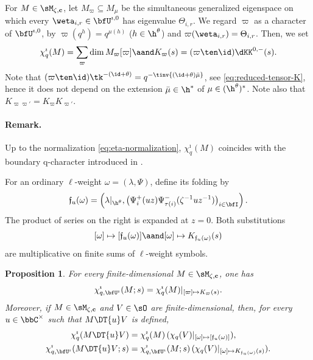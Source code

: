 \documentclass[reqno]{amsart}
\numberwithin{equation}{section}
\newtheorem*{proposition}{Proposition}
\newenvironment{remark}{\medskip\paragraph{{\bf Remark.}}}{\par\medskip}
\begin{document}
For $M\in\sM_{\zeta,\mathbf c}$, let
$M_\varpi\subseteq M_\mu$ be the simultaneous generalized
eigenspace on which every $\weta_{i,r}\in\bfU^{\imath,0}$ has eigenvalue
$\Theta_{i,r}$. We regard $\varpi$ as a character of $\bfU^{\imath,0}$, by
$\varpi(q^{h})=q^{\mu(h)}$ ($h\in\h^\theta$) and $\varpi(\weta_{i,r})=\Theta_{i,r}$.
Then, we set
\begin{equation}\label{eq:boundary-ell-character}
\chi^\imath_q(M)=\sum_\varpi\dim M_\varpi[\varpi]
\aand K_\varpi(s)=(\varpi\ten\id)\dKK^{0,-}(s).
\end{equation}
Note that $(\varpi\ten\id)\tk^{-(\id+\theta)}=q^{-\tinv{(\id+\theta)\bar\mu}}$, see \eqref{eq:reduced-tensor-K}, hence it does not depend on the extension $\bar\mu\in\h^*$ of $\mu\in(\h^\theta)^*$.
Note also that $K_{\varpi\varpi'}=K_\varpi K_{\varpi'}$.

\begin{remark}
Up to the normalization \eqref{eq:eta-normalization}, $\chi^\imath_q(M)$
coincides with the boundary q-character introduced in \cite{li-przezdziecki-25, li-przezdziecki-26}.\hfill\rmkend 
\end{remark}

For an ordinary $\ell$-weight $\omega=(\lambda,\Psi)$, define its folding
by
\begin{equation}\label{eq:boundary-ell-weight-folding}
\mathfrak f_u(\omega)=
\left(\lambda|_{\h^\theta},
\bigl(\Psi_i^+(uz)
\Psi_{\tau(i)}^-(\zeta^{-1}uz^{-1})\bigr)_{i\in\bfI}\right).
\end{equation}
The product of series on the right is expanded at $z=0$.
Both substitutions
\begin{equation}\label{eq:boundary-folding-map}
[\omega]\mapsto[\mathfrak f_u(\omega)]
\aand
[\omega]\mapsto K_{\mathfrak f_u(\omega)}(s)
\end{equation}
are multiplicative on finite sums of $\ell$-weight symbols.

\begin{proposition}\label{prop:boundary-left-module-property}
For every finite-dimensional $M\in\sM_{\zeta,\mathbf c}$, one has
\begin{equation}\label{eq:left-boundary-character-weights}
\chi^\imath_{q,\bfU^\imath}(M;s)
=\chi^\imath_q(M)\vert_{[\varpi]\mapsto K_\varpi(s)}.
\end{equation}
Moreover, if $M\in\sM_{\zeta,\mathbf c}$ and $V\in\sO$ are finite-dimensional,
then, for every $u\in\bbC^\times$ such that $M\DT{u}V$ is defined,
\begin{align}
\chi^\imath_q(M\DT{u}V)
&=\chi^\imath_q(M)\, (\chi_q(V)\vert_{[\omega]\mapsto[\mathfrak f_u(\omega)]}),
\label{eq:boundary-character-Drinfeld-action}\\
\chi^\imath_{q,\bfU^\imath}(M\DT{u}V;s)
&=\chi^\imath_{q,\bfU^\imath}(M;s)\,
(\chi_q(V)\vert_{ [\omega]\mapsto K_{\mathfrak f_u(\omega)}(s)}).
\label{eq:left-boundary-q-character-module-property}
\end{align}
\end{proposition}
\end{document}
